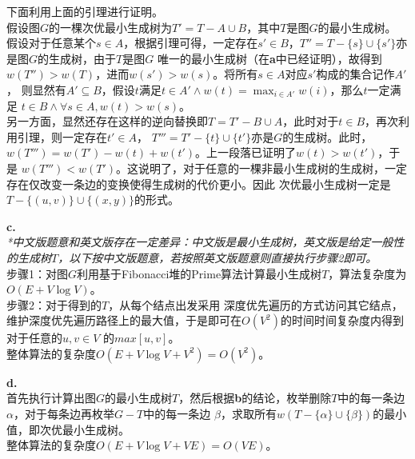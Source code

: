 \begin{solution}
    下面利用上面的引理进行证明。\\
    假设图$G$的一棵次优最小生成树为$T'=T-A\cup B$，其中$T$是图$G$的最小生成树。
    假设对于任意某个$s\in A$，根据引理可得，一定存在$s'\in B$，$T''=T-\{s\}\cup \{s'\}$亦是图$G$的生成树，由于$T$是图$G$
    唯一的最小生成树（在\textbf{a}中已经证明），故得到$w(T'')>w(T)$，进而$w(s')>w(s)$。将所有$s\in A$对应$s'$构成的集合记作$A'$，
    则显然有$A'\subseteq B$，假设$t$满足$t\in A' \wedge w(t) = \max_{i \in A'} w(i)$，那么$t$一定满足
    $t \in B \wedge \forall s \in A, w(t)>w(s)$。\\
    另一方面，显然还存在这样的逆向替换即$T=T'-B\cup A$，此时对于$t \in B$，再次利用引理，则一定存在$t' \in A$，
    $T'''=T'-\{t\}\cup \{t'\}$亦是$G$的生成树。此时，$w(T''') = w(T') - w(t) + w(t')$。上一段落已证明了$w(t)>w(t')$，于是
    $w(T''') < w(T')$。这说明了，对于任意的一棵非最小生成树的生成树，一定存在仅改变一条边的变换使得生成树的代价更小。因此
    次优最小生成树一定是$T-\{(u,v)\}\cup\{(x,y)\}$的形式。

    \textbf{c.}\\
    \textit{*中文版题意和英文版存在一定差异：中文版是最小生成树，英文版是给定一般性的生成树$T$，以下按中文版题意，若按照英文版题意则直接执行步骤2即可。}\\
    步骤1：对图$G$利用基于Fibonacci堆的Prime算法计算最小生成树$T$，算法复杂度为$O(E+V\log V)$。\\
    步骤2：对于得到的$T$，从每个结点出发采用
    深度优先遍历的方式访问其它结点，维护深度优先遍历路径上的最大值，于是即可在$O(V^2)$的时间时间复杂度内得到对于任意的$u,v \in V$
    的$max[u,v]$。\\
    整体算法的复杂度$O(E+V\log V+V^2) = O(V^2)$。

    \textbf{d.}\\
    首先执行计算出图$G$的最小生成树$T$，然后根据\textbf{b}的结论，枚举删除$T$中的每一条边$\alpha$，对于每条边再枚举$G-T$中的每一条边
    $\beta$，求取所有$w(T-\{\alpha\}\cup\{\beta\})$的最小值，即次优最小生成树。\\
    整体算法的复杂度$O(E+V\log V+VE) = O(VE)$。
\end{solution}